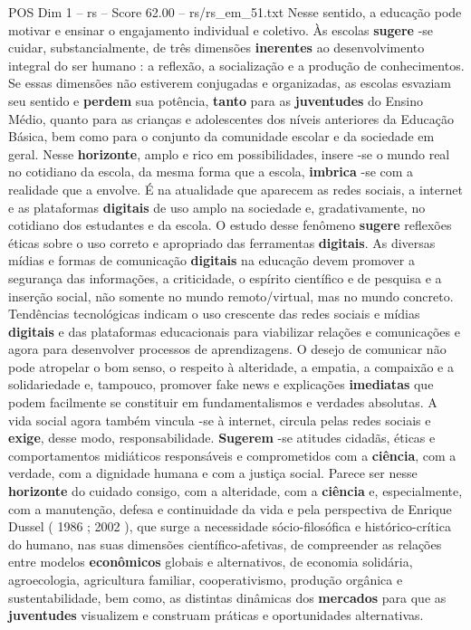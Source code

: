 \begin{textsample}{POS Dim 1 – rs – Score 62.00 – rs/rs\_em\_51.txt}
Nesse sentido, a educação pode motivar e ensinar o engajamento individual e coletivo.
Às escolas \textbf{sugere} -se cuidar, substancialmente, de três dimensões \textbf{inerentes} ao desenvolvimento integral do ser humano : a reflexão, a socialização e a produção de conhecimentos.
Se essas dimensões não estiverem conjugadas e organizadas, as escolas esvaziam seu sentido e \textbf{perdem} sua potência, \textbf{tanto} para as \textbf{juventudes} do Ensino Médio, quanto para as crianças e adolescentes dos níveis anteriores da Educação Básica, bem como para o conjunto da comunidade escolar e da sociedade em geral.
Nesse \textbf{horizonte}, amplo e rico em possibilidades, insere -se o mundo real no cotidiano da escola, da mesma forma que a escola, \textbf{imbrica} -se com a realidade que a envolve.
É na atualidade que aparecem as redes sociais, a internet e as plataformas \textbf{digitais} de uso amplo na sociedade e, gradativamente, no cotidiano dos estudantes e da escola.
O estudo desse fenômeno \textbf{sugere} reflexões éticas sobre o uso correto e apropriado das ferramentas \textbf{digitais}.
As diversas mídias e formas de comunicação \textbf{digitais} na educação devem promover a segurança das informações, a criticidade, o espírito científico e de pesquisa e a inserção social, não somente no mundo remoto/virtual, mas no mundo concreto.
Tendências tecnológicas indicam o uso crescente das redes sociais e mídias \textbf{digitais} e das plataformas educacionais para viabilizar relações e comunicações e agora para desenvolver processos de aprendizagens.
O desejo de comunicar não pode atropelar o bom senso, o respeito à alteridade, a empatia, a compaixão e a solidariedade e, tampouco, promover fake news e explicações \textbf{imediatas} que podem facilmente se constituir em fundamentalismos e verdades absolutas.
A vida social agora também vincula -se à internet, circula pelas redes sociais e \textbf{exige}, desse modo, responsabilidade. \textbf{Sugerem} -se atitudes cidadãs, éticas e comportamentos midiáticos responsáveis e comprometidos com a \textbf{ciência}, com a verdade, com a dignidade humana e com a justiça social.
Parece ser nesse \textbf{horizonte} do cuidado consigo, com a alteridade, com a \textbf{ciência} e, especialmente, com a manutenção, defesa e continuidade da vida e pela perspectiva de Enrique Dussel ( 1986 ; 2002 ), que surge a necessidade sócio-filosófica e histórico-crítica do humano, nas suas dimensões científico-afetivas, de compreender as relações entre modelos \textbf{econômicos} globais e alternativos, de economia solidária, agroecologia, agricultura familiar, cooperativismo, produção orgânica e sustentabilidade, bem como, as distintas dinâmicas dos \textbf{mercados} para que as \textbf{juventudes} visualizem e construam práticas e oportunidades alternativas.

\end{textsample}
